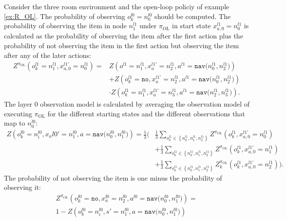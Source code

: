\begin{example}
Consider the three room environment and the open-loop policiy of example \ref{ex:R_OL}. The probability of observing $o_k^{l0}=n_0^{l0}$ should be computed. The probability of observing the item in node $n_1^{l1}$ under $\pi_\text{OL}$ in start state $x_{a,0}^{l1}=n_0^{l1}$ is calculated as the probability of observing the item after the first action plus the probability of not observing the item in the first action but observing the item after any of the later actions:
\begin{equation}
    \begin{aligned}
        Z^{\pi_\text{OL}}\left( o_k^{l1}=n_1^{l1},x_{a,0}^{l1\prime}=n_0^{l1} \right) = &Z\left(o^{l1}=n_1^{l1}, x_a^{l1\prime}=n_2^{l1}, a^{l1}=\texttt{nav($n_0^{l1}, n_2^{l1}$)} \right)\\
        &+ Z\left(o_k^{l1}=\texttt{no}, x_a^{l1\prime}=n_2^{l1}, a^{l1}=\texttt{nav($n_0^{l1}, n_2^{l1}$)} \right)\\
        &\cdot Z\left(o_k^{l1}=n_1^{l1}, x_a^{l1\prime}=n_3^{l1}, a^{l1}=\texttt{nav($n_2^{l1}, n_3^{l1}$)} \right).
    \end{aligned}
\end{equation}
The layer 0 observation model is calculated by averaging the observation model of executing $\pi_\text{OL}$ for the different starting states and the different observations that map to $n_0^{l0}$:
\begin{equation}
    \begin{aligned}
        Z\left(o_k^{l0}=n_i^{l0},x_a{l0\prime}=n_1^{l0}, a=\texttt{nav($n_0^{l0}, n_1^{l0}$)}\right) = \frac{1}{3}\bigg( &\frac{1}{3}\sum_{o_k^{l1}\in\left\{n_0^{l1},n_1^{l1},n_2^{l1}\right\}} Z^{\pi_\text{OL}}\left( o_k^{l1},x_{a,0}^{l1\prime}=n_0^{l1} \right)\\
        &+\frac{1}{3}\sum_{o_k^{l1}\in\left\{n_0^{l1},n_1^{l1},n_2^{l1}\right\}} Z^{\pi_\text{OL}}\left( o_k^{l1},x_{a,0}^{l1\prime}=n_1^{l1} \right)  \\
        & +\frac{1}{3}\sum_{o_k^{l1}\in\left\{n_0^{l1},n_1^{l1},n_2^{l1}\right\}} Z_k^{\pi_\text{OL}}\left( o_k^{l1},x_{a,0}^{l1\prime}=n_2^{l1} \right) \bigg).
    \end{aligned}
\end{equation}
The probability of not observing the item is one minus the probability of observing it:
\begin{multline}
    Z^{\pi_\text{OL}}\left( o_k^{l0}=\texttt{no}, x_a^{l0}=n_2^{l0}, a^{l0}=\texttt{nav($n_0^{l0},n_1^{l0}$)}\right) = \\
    1 - Z\left(o_k^{l0}=n_i^{l0},s'=n_1^{l0}, a=\texttt{nav($n_0^{l0}, n_1^{l0}$)}\right)
\end{multline}
\demo
\end{example}

